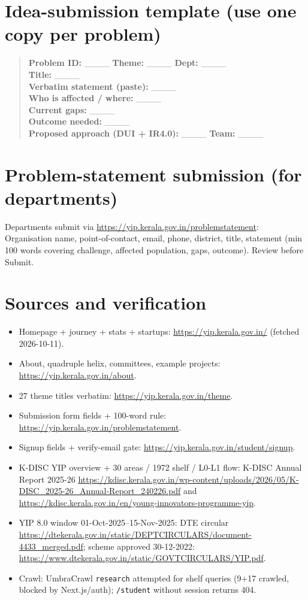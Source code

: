 \documentclass[11pt,a4paper]{article}
\begin{document}
\section{Idea-submission template (use one copy per problem)}
\begin{quote}
\small
\textbf{Problem ID:} \_\_\_\_ \quad \textbf{Theme:} \_\_\_\_ \quad \textbf{Dept:} \_\_\_\_\\
\textbf{Title:} \_\_\_\_\\
\textbf{Verbatim statement (paste):} \_\_\_\_\\
\textbf{Who is affected / where:} \_\_\_\_\\
\textbf{Current gaps:} \_\_\_\_\\
\textbf{Outcome needed:} \_\_\_\_\\
\textbf{Proposed approach (DUI + IR4.0):} \_\_\_\_ \quad \textbf{Team:} \_\_\_\_
\end{quote}

\section{Problem-statement submission (for departments)}
Departments submit via \url{https://yip.kerala.gov.in/problemstatement}: Organisation name, point-of-contact, email, phone, district, title, statement (min 100 words covering challenge, affected population, gaps, outcome). Review before Submit.

\section{Sources and verification}
\begin{itemize}[leftmargin=1.2em]
\item Homepage + journey + stats + startups: \url{https://yip.kerala.gov.in/} (fetched 2026-10-11).
\item About, quadruple helix, committees, example projects: \url{https://yip.kerala.gov.in/about}.
\item 27 theme titles verbatim: \url{https://yip.kerala.gov.in/theme}.
\item Submission form fields + 100-word rule: \url{https://yip.kerala.gov.in/problemstatement}.
\item Signup fields + verify-email gate: \url{https://yip.kerala.gov.in/student/signup}.
\item K-DISC YIP overview + 30 areas / 1972 shelf / L0-L1 flow: K-DISC Annual Report 2025-26 \url{https://kdisc.kerala.gov.in/wp-content/uploads/2026/05/K-DISC_2025-26_Annual-Report_240226.pdf} and \url{https://kdisc.kerala.gov.in/en/young-innovators-programme-yip}.
\item YIP 8.0 window 01-Oct-2025--15-Nov-2025: DTE circular \url{https://dtekerala.gov.in/static/DEPTCIRCULARS/document-4433_merged.pdf}; scheme approved 30-12-2022: \url{https://www.dtekerala.gov.in/static/GOVTCIRCULARS/YIP.pdf}.
\item Crawl: UmbraCrawl \texttt{research} attempted for shelf queries (9+17 crawled, blocked by Next.js/auth); \texttt{/student} without session returns 404.
\end{itemize}
\end{document}
